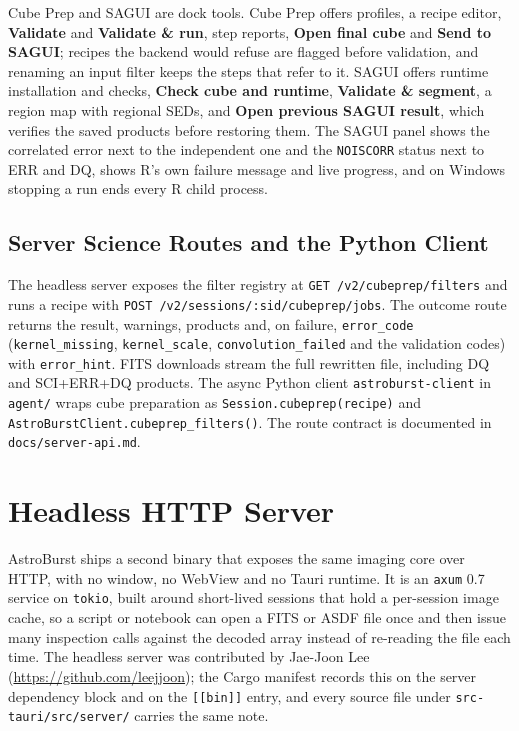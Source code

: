 \documentclass[11pt,a4paper]{article}
\newcommand{\code}[1]{\texttt{\small #1}}
\newcommand{\crate}[1]{\texttt{#1}}
\begin{document}
    Cube Prep and SAGUI are dock tools. Cube Prep offers profiles, a recipe editor, \textbf{Validate} and \textbf{Validate \& run}, step reports, \textbf{Open final cube} and \textbf{Send to SAGUI}; recipes the backend would refuse are flagged before validation, and renaming an input filter keeps the steps that refer to it. SAGUI offers runtime installation and checks, \textbf{Check cube and runtime}, \textbf{Validate \& segment}, a region map with regional SEDs, and \textbf{Open previous SAGUI result}, which verifies the saved products before restoring them. The SAGUI panel shows the correlated error next to the independent one and the \code{NOISCORR} status next to ERR and DQ, shows R's own failure message and live progress, and on Windows stopping a run ends every R child process.

    \subsection{Server Science Routes and the Python Client}
    \label{sec:server_science}
    \label{sec:pyclient}

    The headless server exposes the filter registry at \code{GET /v2/cubeprep/filters} and runs a recipe with \code{POST /v2/sessions/:sid/cubeprep/jobs}. The outcome route returns the result, warnings, products and, on failure, \code{error\_code} (\code{kernel\_missing}, \code{kernel\_scale}, \code{convolution\_failed} and the validation codes) with \code{error\_hint}. FITS downloads stream the full rewritten file, including DQ and SCI+ERR+DQ products. The async Python client \code{astroburst-client} in \code{agent/} wraps cube preparation as \code{Session.cubeprep(recipe)} and \code{AstroBurstClient.cubeprep\_filters()}. The route contract is documented in \code{docs/server-api.md}.

    \section{Headless HTTP Server}
    \label{sec:server}

    AstroBurst ships a second binary that exposes the same imaging core over HTTP, with no window, no WebView and no Tauri runtime. It is an \crate{axum} 0.7 service on \crate{tokio}, built around short-lived sessions that hold a per-session image cache, so a script or notebook can open a FITS or ASDF file once and then issue many inspection calls against the decoded array instead of re-reading the file each time. The headless server was contributed by Jae-Joon Lee (\url{https://github.com/leejjoon}); the Cargo manifest records this on the server dependency block and on the \code{[[bin]]} entry, and every source file under \code{src-tauri/src/server/} carries the same note.
\end{document}
